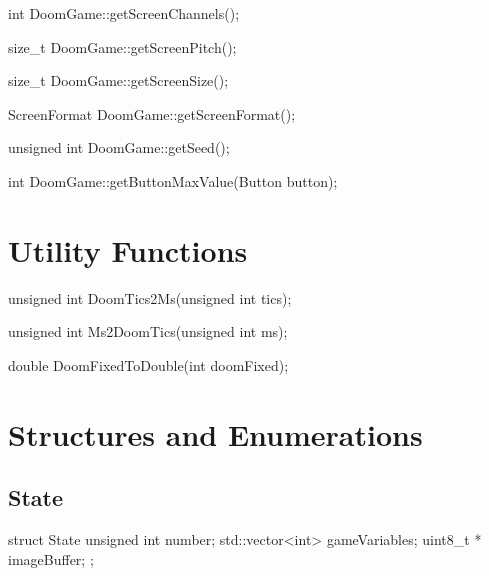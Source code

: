 \documentclass[english,bachelor,a4paper,twoside]{ppfcmthesis}
\begin{document}
\begin{clinee}
int DoomGame::getScreenChannels();
\end{clinee}

\begin{clinee}
size_t DoomGame::getScreenPitch();
\end{clinee}

\begin{clinee}
size_t DoomGame::getScreenSize();
\end{clinee}

\begin{clinee}
ScreenFormat DoomGame::getScreenFormat();
\end{clinee}

\begin{clinee}
unsigned int DoomGame::getSeed();
\end{clinee}

\begin{clinee}
int DoomGame::getButtonMaxValue(Button button);
\end{clinee}

\section {Utility Functions}


\begin{clinee}
unsigned int DoomTics2Ms(unsigned int tics);
\end{clinee}


\begin{clinee}
unsigned int Ms2DoomTics(unsigned int ms);
\end{clinee}


\begin{clinee}
double DoomFixedToDouble(int doomFixed);
\end{clinee}


\section{Structures and Enumerations}\label{sec:appendix_structs_and_enums}
\subsection{State}

	
\begin{clinee}
	struct State {
	    unsigned int number; 
	    std::vector<int> gameVariables;
	    uint8_t * imageBuffer;
	};
\end{clinee}
\end{document}
